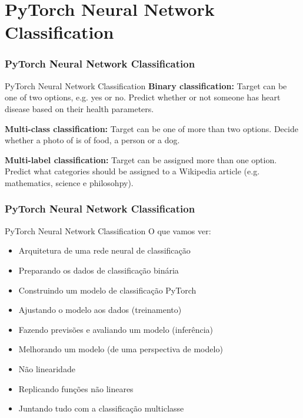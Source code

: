 \documentclass{beamer}
\begin{document}
\section{PyTorch Neural Network Classification}

\begin{frame}
	\frametitle{PyTorch Neural Network Classification}
	\begin{block}{PyTorch Neural Network Classification}
		\textbf{Binary classification:} Target can be one of two options, e.g. yes or no. Predict whether or not someone has heart disease based on their health parameters. 
		
		\textbf{Multi-class classification:} Target can be one of more than two options. Decide whether a photo of is of food, a person or a dog.
		
		\textbf{Multi-label classification:} Target can be assigned more than one option. Predict what categories should be assigned to a Wikipedia article (e.g. mathematics, science e philosohpy).
	\end{block}
\end{frame}
\begin{frame}
	\frametitle{PyTorch Neural Network Classification}
	\begin{block}{PyTorch Neural Network Classification}
		O que vamos ver:
		\begin{itemize}
			\item Arquitetura de uma rede neural de classificação
			\item Preparando os dados de classificação binária
			\item Construindo um modelo de classificação PyTorch
			\item Ajustando o modelo aos dados (treinamento)
			\item Fazendo previsões e avaliando um modelo (inferência)
			\item Melhorando um modelo (de uma perspectiva de modelo)
			\item Não linearidade
			\item Replicando funções não lineares
			\item Juntando tudo com a classificação multiclasse
		\end{itemize}
	\end{block}
\end{frame}
\end{document}
